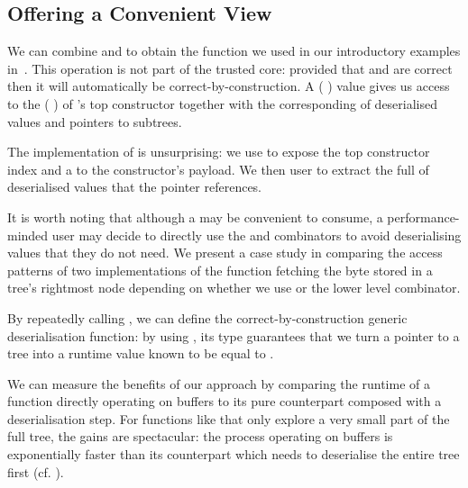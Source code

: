 \subsection{Offering a Convenient View}\label{sec:dataview}

We can combine  and  to obtain
the  function we used in our introductory examples
in~.
%
This operation is not part of the trusted core: provided that
 and  are correct then
it will automatically be correct-by-construction.
%
A (  ) value gives us
access to the ( ) of
's top constructor together with the corresponding
 of deserialised values and pointers to subtrees.


The implementation of  is unsurprising: we use
 to expose the top constructor index and a
 to the constructor's payload.
%
We then user  to extract the full
 of deserialised values that the
pointer references.


It is worth noting that although a  may be
convenient to consume, a performance-minded user may decide to
directly use the  and 
combinators to avoid deserialising values that they do not need.
%
We present a case study in  comparing the
access patterns of two implementations of the function fetching the
byte stored in a tree's rightmost node depending on whether we use
 or the lower level  combinator.

By repeatedly calling , we can define the
correct-by-construction generic deserialisation function: by
using , its type guarantees that we turn
a pointer to a tree  into a runtime value known
to be equal to .


We can measure the benefits of our approach by comparing the runtime
of a function directly operating on buffers to its pure counterpart
composed with a deserialisation step.
%
For functions like  that only explore a
very small part of the full tree, the gains are spectacular: the
process operating on buffers is exponentially faster than its
counterpart which needs to deserialise the entire tree first
(cf. ).
